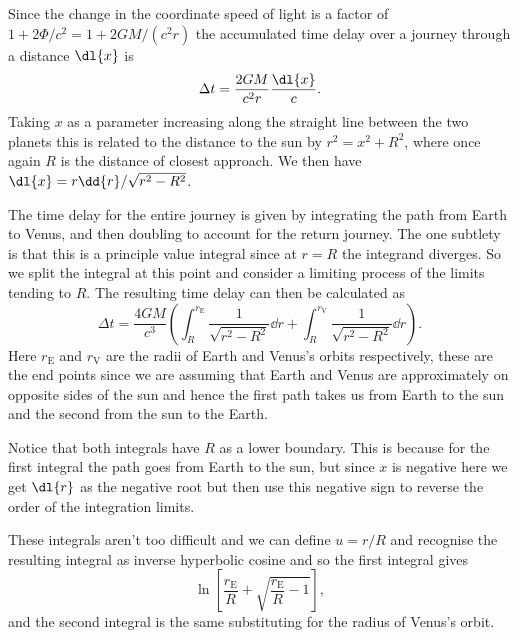 \documentclass[fleqn]{NotesClass}
\begin{document}
    Since the change in the coordinate speed of light is a factor of \(1 + 2\Phi/c^2 = 1 + 2GM/(c^2r)\) the accumulated time delay over a journey through a distance \(\dl{x}\) is
    \begin{equation}
        \Delta t = \frac{2GM}{c^2r} \frac{\dl{x}}{c}.
    \end{equation}
    Taking \(x\) as a parameter increasing along the straight line between the two planets this is related to the distance to the sun by \(r^2 = x^2 + R^2\), where once again \(R\) is the distance of closest approach.
    We then have \(\dl{x} = r \dd{r} / \sqrt{r^2 - R^2}\).
    
    The time delay for the entire journey is given by integrating the path from Earth to Venus, and then doubling to account for the return journey.
    The one subtlety is that this is a principle value integral since at \(r = R\) the integrand diverges.
    So we split the integral at this point and consider a limiting process of the limits tending to \(R\).
    The resulting time delay can then be calculated as
    \begin{equation}
        \Delta t = \frac{4GM}{c^3} \left( \int_R^{r_{\mathrm{E}}} \frac{1}{\sqrt{r^2 - R^2}} \dd{r} + \int_{R}^{r_{\mathrm{V}}} \frac{1}{\sqrt{r^2 - R^2}} \dd{r} \right).
    \end{equation}
    Here \(r_{\mathrm{E}}\) and \(r_{\mathrm{V}}\) are the radii of Earth and Venus's orbits respectively, these are the end points since we are assuming that Earth and Venus are approximately on opposite sides of the sun and hence the first path takes us from Earth to the sun and the second from the sun to the Earth.
    
    Notice that both integrals have \(R\) as a lower boundary.
    This is because for the first integral the path goes from Earth to the sun, but since \(x\) is negative here we get \(\dl{r}\) as the negative root but then use this negative sign to reverse the order of the integration limits.
    
    These integrals aren't too difficult and we can define \(u = r / R\) and recognise the resulting integral as inverse hyperbolic cosine and so the first integral gives
    \begin{equation}
        \ln\left[ \frac{r_{\mathrm{E}}}{R} + \sqrt{ \frac{r_{\mathrm{E}}}{R} - 1} \right],
    \end{equation}
    and the second integral is the same substituting for the radius of Venus's orbit.
    
\end{document}
